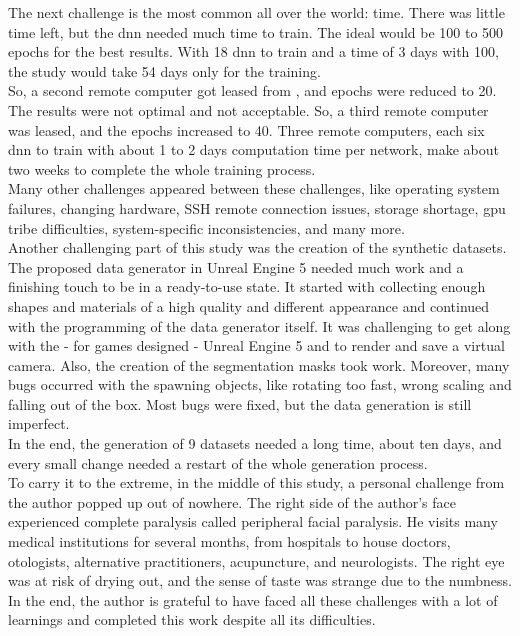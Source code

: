 		The next challenge is the most common all over the world: time. There was little time left, but the \ac{dnn} needed much time to train. The ideal would be 100 to 500 epochs for the best results. With 18 \ac{dnn} to train and a time of 3 days with 100, the study would take 54 days only for the training.\\
		So, a second remote computer got leased from \cite{shadow}, and epochs were reduced to 20. The results were not optimal and not acceptable. So, a third remote computer was leased, and the epochs increased to 40. Three remote computers, each six \ac{dnn} to train with about 1 to 2 days computation time per network, make about two weeks to complete the whole training process. \\
		Many other challenges appeared between these challenges, like operating system failures, changing hardware, SSH remote connection issues, storage shortage, \ac{gpu} tribe difficulties,  system-specific inconsistencies, and many more.\\
		Another challenging part of this study was the creation of the synthetic datasets. The proposed data generator in Unreal Engine 5 needed much work and a finishing touch to be in a ready-to-use state. It started with collecting enough shapes and materials of a high quality and different appearance and continued with the programming of the data generator itself. It was challenging to get along with the - for games designed - Unreal Engine 5 and to render and save a virtual camera. Also, the creation of the segmentation masks took work. Moreover, many bugs occurred with the spawning objects, like rotating too fast, wrong scaling and falling out of the box. Most bugs were fixed, but the data generation is still imperfect.\\
		In the end, the generation of 9 datasets needed a long time, about ten days, and every small change needed a restart of the whole generation process.\\
		To carry it to the extreme, in the middle of this study, a personal challenge from the author popped up out of nowhere. The right side of the author's face experienced complete paralysis called peripheral facial paralysis. He visits many medical institutions for several months, from hospitals to house doctors, otologists, alternative practitioners, acupuncture, and neurologists. The right eye was at risk of drying out, and the sense of taste was strange due to the numbness. \\
		In the end, the author is grateful to have faced all these challenges with a lot of learnings and completed this work despite all its difficulties.\\
